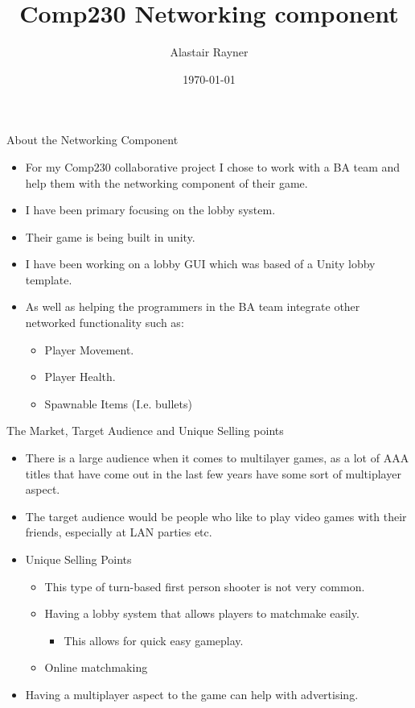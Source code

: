 \documentclass{beamer}
\title{Comp230 Networking component}
\author{Alastair Rayner}
\date{\today}
\begin{document}
\maketitle

\begin{frame}{About the Networking Component}
	\begin{itemize}
		\item For my Comp230 collaborative project I chose to work with a BA team and help them with the networking component of their game.\pause
		\item I have been primary focusing on the lobby system. \pause
		\item Their game is being built in unity. \pause
		\item I have been working on a lobby GUI which was based of a Unity lobby template. \pause
		\item As well as helping the programmers in the BA team integrate other networked functionality such as: \pause
		\begin{itemize}
			\item Player Movement. \pause
			\item Player Health. \pause
			\item Spawnable Items (I.e. bullets)
		\end{itemize}
	\end{itemize}
\end{frame}

\begin{frame}{The Market, Target Audience and Unique Selling points}
	\begin{itemize}
		\item There is a large audience when it comes to multilayer games, as a lot of AAA titles that have come out in the last few years have some sort of multiplayer aspect. \pause
		\item The target audience would be people who like to play video games with their friends, especially at LAN parties etc. \pause
		\item Unique Selling Points \pause
			\begin{itemize}
				\item This type of turn-based first person shooter is not very common. \pause
				\item Having a lobby system that allows players to matchmake easily. \pause
				\begin{itemize}
					\item This allows for quick easy gameplay.  \pause
				\end{itemize}
				\item  Online matchmaking \pause
				
			\end{itemize}
		\item Having a multiplayer aspect to the game can help with advertising.
	\end{itemize}
\end{frame}
\end{document}
